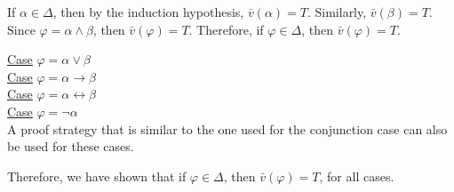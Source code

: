 \documentclass[12pt]{article}	%
\begin{document}
\begin{flushleft}
\vspace{2mm}

If $\alpha \in \Delta$, then by the induction hypothesis, $\bar{v}(\alpha) = T$. Similarly, $\bar{v}(\beta) = T$. Since $\varphi = \alpha \wedge \beta$, then $\bar{v}(\varphi) = T$. Therefore, if $\varphi \in \Delta$, then $\bar{v}(\varphi) = T$. \\

\vspace{2mm}

\underline{Case} $\varphi = \alpha \vee \beta$ \\
\underline{Case} $\varphi = \alpha \rightarrow \beta$ \\
\underline{Case} $\varphi = \alpha \leftrightarrow \beta$ \\
\underline{Case} $\varphi = \neg\alpha$ \\
A proof strategy that is similar to the one used for the conjunction case can also be used for these cases.

\vspace{2mm}

Therefore, we have shown that if $\varphi \in \Delta$, then $\bar{v}(\varphi) = T$, for all cases.



\end{flushleft}

%
%
\end{document}
